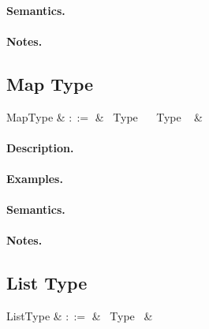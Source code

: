 \paragraph{Semantics.}

\paragraph{Notes.} 


\subsection{Map Type}

\begin{syntax}
  MapType & $::=$ & \token{\{} \ Type \ \token{=>} \ Type \ \token{\}} &\\
\end{syntax}

\paragraph{Description.}

\paragraph{Examples.}

\paragraph{Semantics.}

\paragraph{Notes.} 


\subsection{List Type}

\begin{syntax}
  ListType & $::=$ & \token{[} \ Type \ \token{]}&\\
\end{syntax}

